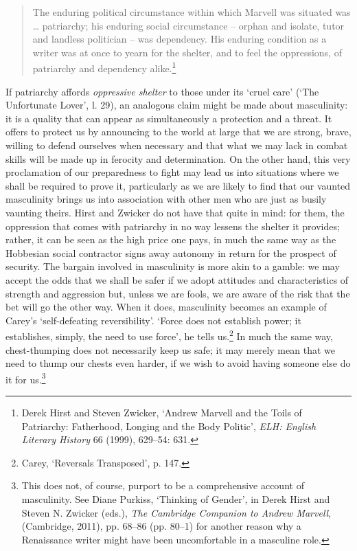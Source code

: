 ﻿\documentclass[12pt]{article}
\newcommand{\citedtitle}[1]{\textit{#1}}
\begin{document}
\begin{quote}
The enduring political circumstance within which Marvell was situated was …
patriarchy; his enduring social circumstance – orphan and isolate, tutor and
landless politician – was dependency. His enduring condition as a writer was at
once to yearn for the shelter, and to feel the oppressions, of patriarchy and dependency
alike.\footnote{Derek Hirst and Steven Zwicker, ‘Andrew Marvell and the Toils of Patriarchy: Fatherhood, Longing and
the Body Politic’, \citedtitle{ELH: English Literary History} 66 (1999), 629–54: 631.}
\end{quote}
If patriarchy affords \emph{oppressive shelter}
to those under its ‘cruel care’ (‘The Unfortunate Lover’, l. 29), an analogous
claim might be made about masculinity: it is a quality that can appear as
simultaneously a protection and a threat. It offers to protect us by announcing
to the world at large that we are strong, brave, willing to defend ourselves
when necessary and that what we may lack in combat skills will be made up in
ferocity and determination.
On the other hand, this very proclamation of our preparedness to fight may lead
us into situations where we shall be required to prove it, particularly as we
are likely to find that our vaunted masculinity brings us into association with
other men who are just as busily vaunting theirs. Hirst and Zwicker do not have that
quite in mind: for them, the oppression that comes with patriarchy in no way
lessens the shelter it provides; rather, it can be seen as the high price one
pays, in much the same way as the Hobbesian social contractor signs away
autonomy in return for the prospect of security. The bargain involved in
masculinity is more akin to a gamble: we may accept the odds that we shall be
safer if we adopt attitudes and characteristics of strength and aggression but,
unless we are fools, we are aware of the risk that the bet will go the other
way. When it does, masculinity becomes an example of Carey’s ‘self-defeating
reversibility’. ‘Force does not establish power; it establishes, simply, the
need to use force’, he tells us.\footnote{Carey, ‘Reversals Transposed’, p. 147.}
In much the same way, chest-thumping does not necessarily keep us safe; it may
merely mean that we need to thump our chests even harder, if we wish to avoid
having someone else do it for us.\footnote{This does not, of
course, purport to be a comprehensive account of masculinity. See Diane
Purkiss, ‘Thinking of Gender’, in Derek Hirst and Steven N. Zwicker (eds.), \citedtitle{The
Cambridge Companion to Andrew Marvell}, (Cambridge, 2011), pp. 68–86 (pp.
80–1) for another reason why a Renaissance writer might have been uncomfortable
in a masculine role.}
\end{document}

